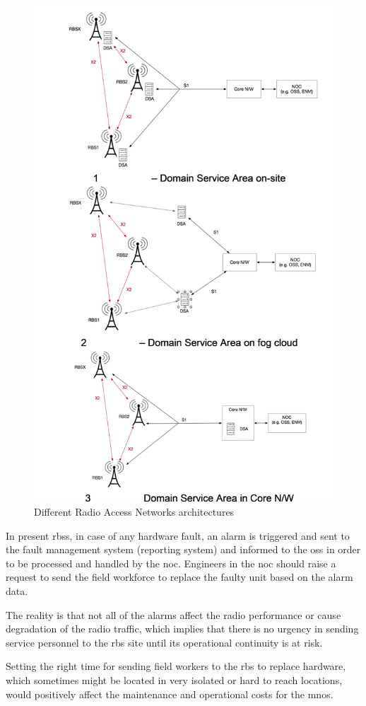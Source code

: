 \begin{figure}[H]
	\centering
	\includegraphics[height=0.9\linewidth]{figures/RANs.png}
	\caption{Different Radio Access Networks architectures}
	\label{fig:rans}
\end{figure}

In present \acp{rbs}, in case of any hardware fault,  an alarm is triggered and sent to the fault management system (reporting system) and informed to the \ac{oss} in order to be processed and handled by the \ac{noc}. Engineers in the \ac{noc} should raise a request to send the field workforce to replace the faulty unit based on the alarm data.

The reality is that not all of the alarms affect the radio performance or cause degradation of the radio traffic, which implies that there is no urgency in sending service personnel to the \ac{rbs} site until its operational continuity is at risk. 

Setting the right time for sending field workers to the \ac{rbs} to replace hardware, which sometimes might be located in very isolated or hard to reach locations,  would positively affect the maintenance and operational costs for the \acp{mno}.


